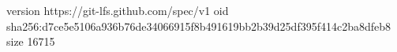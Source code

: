 version https://git-lfs.github.com/spec/v1
oid sha256:d7ce5e5106a936b76de34066915f8b491619bb2b39d25df395f414c2ba8dfeb8
size 16715

